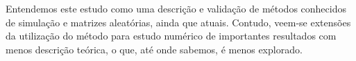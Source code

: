 \documentclass[12pt]{report}
\begin{document}
Entendemos este estudo como uma descrição e validação de métodos conhecidos de simulação e matrizes aleatórias, ainda que atuais. Contudo, veem-se extensões da utilização do método para estudo numérico de importantes resultados com menos descrição teórica, o que, até onde sabemos, é menos explorado.






\end{document}
